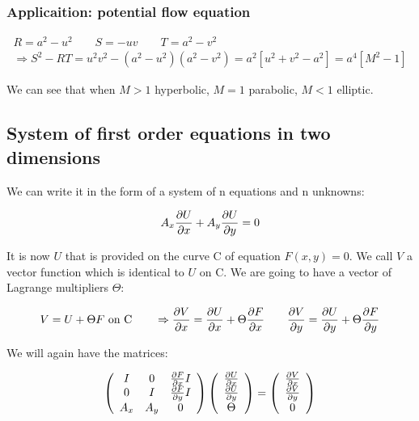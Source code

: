 \subsubsection{Applicaition: potential flow equation}

\begin{equation}
\begin{array}{c}
R = a^2 - u^2 \qquad S = -uv \qquad T = a^2 - v^2 \\ 
\Rightarrow S^2 - RT = u^2v^2 - (a^2 -u^2)(a^2 - v^2) = a^2 [u^2 + v^2 - a^2] = a^4 \left[M^2 - 1 \right]
\end{array}
\end{equation}

We can see that when $M>1$ hyperbolic, $M = 1$ parabolic, $M<1$ elliptic. 

\subsection{System of first order equations in two dimensions}
We can write it in the form of a system of n equations and n unknowns:

\begin{equation}
A_x \frac{\partial U}{\partial x}  +A_y \frac{\partial U}{\partial y} = 0
\end{equation}

It is now $U$ that is provided on the curve C of equation $F(x,y) = 0$. We call $V$ a vector function which is identical to $U$ on C. We are going to have a vector of Lagrange multipliers $\Theta$: 

\begin{equation}
V = U + \Theta F \mbox{ on C} \qquad \Rightarrow \frac{\partial V}{\partial x} = \frac{\partial U}{\partial x} + \Theta \frac{\partial F}{\partial x} \qquad \frac{\partial V}{\partial y} = \frac{\partial U}{\partial y} + \Theta \frac{\partial F}{\partial y}
\end{equation}

We will again have the matrices: 

\begin{equation}
\left( 
\begin{array}{ccc}
I & 0 & \frac{\partial F}{\partial x}I\\
0 & I & \frac{\partial F}{\partial y} I\\
A_x & A_y & 0
\end{array}
\right)
\left(
\begin{array}{c}
\frac{\partial U}{\partial x}\\
\frac{\partial U}{\partial y}\\
\Theta
\end{array}
\right)
=
\left(
\begin{array}{c}
\frac{\partial V}{\partial x}\\
\frac{\partial V}{\partial y}\\
0
\end{array}
\right)
\end{equation}

